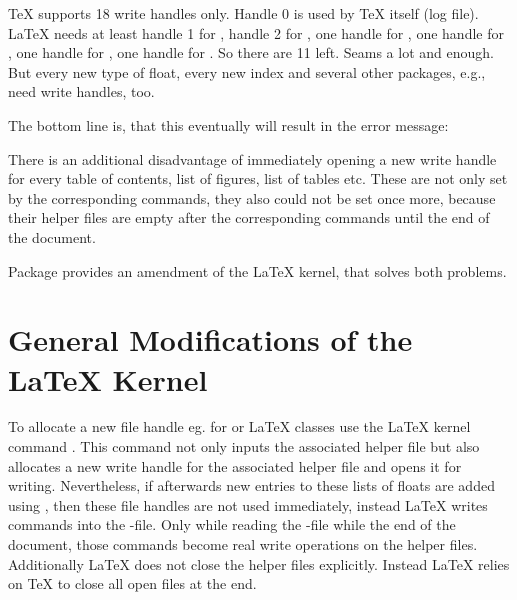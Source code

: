 \TeX{} supports 18 write handles only. Handle 0 is used by \TeX{} itself (log
file). \LaTeX{} needs at least handle 1 for , handle 2 for
, one handle for , one handle for
, one handle for , one handle for
. So there are 11 left. Seams a lot and enough. But every new
type of float, every new index and several other packages, e.g.,
 need write handles, too.

The bottom line is, that this eventually will result in the error message:

There is an additional disadvantage of immediately opening a new write handle
for every table of contents, list of figures, list of tables etc.  These are
not only set by the corresponding commands, they also could not be set once
more, because their helper files are empty after the corresponding commands
until the end of the document.

Package  provides an amendment of the \LaTeX{} kernel,
that solves both problems.

\section{General Modifications of the \LaTeX{} Kernel}

To allocate a new file handle eg. for  or
 \LaTeX{} classes use the \LaTeX{} kernel command
. This command not only inputs the
associated helper file but also allocates a new write handle for the
associated helper file and opens it for writing. Nevertheless, if afterwards
new entries to these lists of floats are added using ,
then these file handles are not used immediately, instead \LaTeX{} writes
 commands into the
-file. Only while reading the -file while the end of the
document, those  commands become real write operations
on the helper files. Additionally \LaTeX{} does not close the helper files
explicitly. Instead \LaTeX{} relies on \TeX{} to close all open files at
the end.

